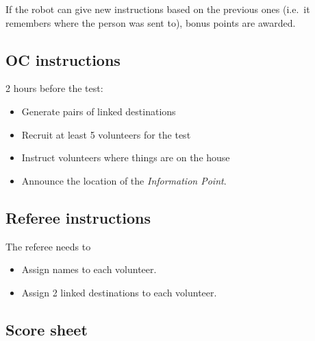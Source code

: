 \begin{enumerate}[nosep]
	If the robot can give new instructions based on the previous ones (i.e.~it remembers where the person was sent to), bonus points are awarded.
\end{enumerate}

\subsection*{OC instructions}
2 hours before the test:
\begin{itemize}
	\item Generate pairs of linked destinations
	\item Recruit at least 5 volunteers for the test
	\item Instruct volunteers where things are on the house
	\item Announce the location of the \emph{Information Point}.
\end{itemize}

\subsection*{Referee instructions}
The referee needs to
\begin{itemize}
	\item Assign names to each volunteer.
	\item Assign 2 linked destinations to each volunteer.
\end{itemize}

\subsection*{Score sheet}
